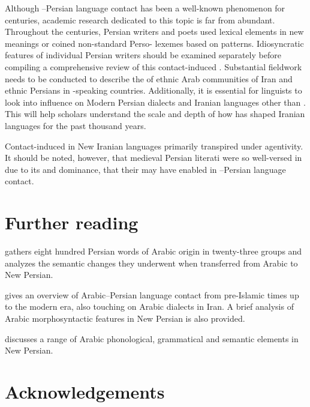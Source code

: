 \documentclass[output=paper]{langsci/langscibook}
\begin{document}
Although –Persian language contact has been a well-known phenomenon for centuries, academic research dedicated to this topic is far from abundant. Throughout the centuries, Persian writers and poets used  lexical elements in new meanings or coined non-standard Perso- lexemes based on   patterns. Idiosyncratic features of individual Persian writers should be examined separately before compiling a comprehensive review of this contact-induced . Substantial fieldwork needs to be conducted to describe the  of ethnic Arab communities of Iran and ethnic Persians in -speaking countries. Additionally, it is essential for linguists to look into  influence on Modern Persian dialects and Iranian languages other than . This will help scholars understand the scale and depth of how  has shaped Iranian languages for the past thousand years.

Contact-induced  in New Iranian languages primarily transpired under  agentivity. It should be noted, however, that medieval Persian literati were so well-versed in  due to its  and dominance, that their  may have enabled  in –Persian language contact.

\section*{Further reading}
\begin{furtherreading}
\item \citet{Asbaghi1987} gathers eight hundred Persian words of {Arabic} origin in twenty-three groups and analyzes the semantic changes they underwent when transferred from {Arabic} to {New Persian}.
\item \citet{Gazsi2011} gives an overview of {Arabic}–Persian language contact from pre-Is\-lam\-ic times up to the modern era, also touching on {Arabic} dialects in Iran. A brief analysis of {Arabic} morphosyntactic features in {New Persian} is also provided.
\item \citet{Ṣādiqī2011} discusses a range of {Arabic} phonological, grammatical and semantic elements in {New Persian}.
\end{furtherreading}

\section*{Acknowledgements}
\end{document}
